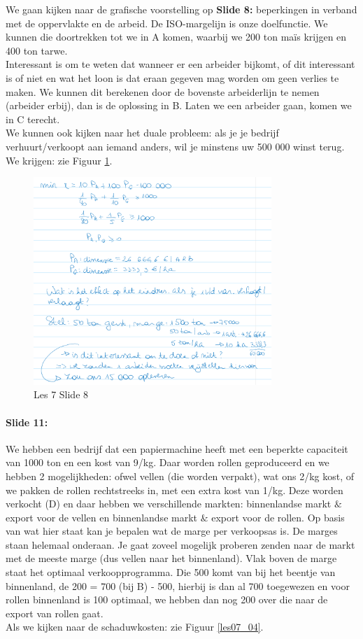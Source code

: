 \documentclass[10pt,a4paper]{report}
\begin{document}
We gaan kijken naar de grafische voorstelling op \textbf{Slide 8:} beperkingen in verband met de oppervlakte en de arbeid. De ISO-margelijn is onze doelfunctie. We kunnen die doortrekken tot we in A komen, waarbij we 200 ton ma\"is krijgen en 400 ton tarwe.\\ Interessant is om te weten dat wanneer er een arbeider bijkomt, of dit interessant is of niet en wat het loon is dat eraan gegeven mag worden om geen verlies te maken. We kunnen dit berekenen door de bovenste arbeiderlijn te nemen (arbeider erbij), dan is de oplossing in B. Laten we een arbeider gaan, komen we in C terecht.\\
We kunnen ook kijken naar het duale probleem: als je je bedrijf verhuurt/verkoopt aan iemand anders, wil je minstens uw 500 000 winst terug. We krijgen: zie Figuur \ref{les07_03}.

\begin{figure}[h!]
\centering
\includegraphics[width=90mm]{Les07_03.png}
\caption{Les 7 Slide 8} 
\label{les07_03}
\end{figure}

\paragraph{Slide 11:} We hebben een bedrijf dat een papiermachine heeft met een beperkte capaciteit van 1000 ton en een kost van 9/kg. Daar worden rollen geproduceerd en we hebben 2 mogelijkheden: ofwel vellen (die worden verpakt), wat ons 2/kg kost, of we pakken de rollen rechtstreeks in, met een extra kost van 1/kg. Deze worden verkocht (D) en daar hebben we verschillende markten: binnenlandse markt $\&$ export voor de vellen en binnenlandse markt $\&$ export voor de rollen. Op basis van wat hier staat kan je bepalen wat de marge per verkoopsas is. De marges staan helemaal onderaan. Je gaat zoveel mogelijk proberen zenden naar de markt met de meeste marge (dus vellen naar het binnenland). Vlak boven de marge staat het optimaal verkoopprogramma. Die 500 komt van bij het beentje van binnenland, de 200 = 700 (bij B) - 500, hierbij is dan al 700 toegewezen en voor rollen binnenland is 100 optimaal, we hebben dan nog 200 over die naar de export van rollen gaat.\\
Als we kijken naar de schaduwkosten: zie Figuur \ref{les07_04}.
\end{document}
